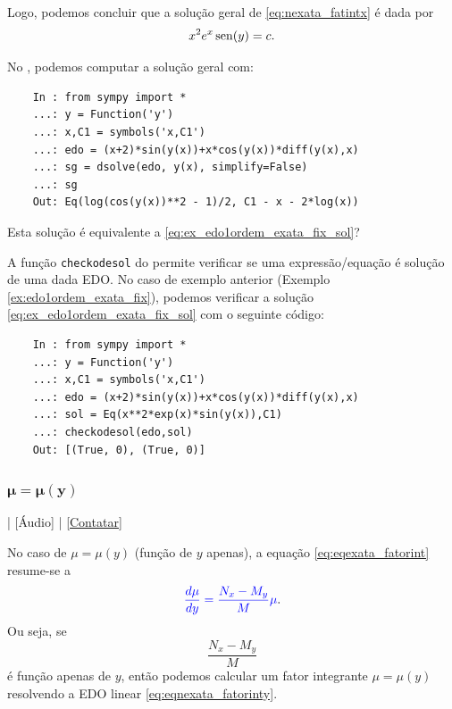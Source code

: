 \begin{ex}
  Logo, podemos concluir que a solução geral de \eqref{eq:nexata_fatintx}  é dada por
  \begin{equation}\label{eq:ex_edo1ordem_exata_fix_sol}
    x^2e^x\operatorname{sen}(y) = c.  
  \end{equation}

  \ifispython
  No \python, podemos computar a solução geral com:
  \begin{lstlisting}
    In : from sympy import *
    ...: y = Function('y')
    ...: x,C1 = symbols('x,C1')
    ...: edo = (x+2)*sin(y(x))+x*cos(y(x))*diff(y(x),x)
    ...: sg = dsolve(edo, y(x), simplify=False)
    ...: sg
    Out: Eq(log(cos(y(x))**2 - 1)/2, C1 - x - 2*log(x))
  \end{lstlisting}
  Esta solução é equivalente a \eqref{eq:ex_edo1ordem_exata_fix_sol}?
  \fi
\end{ex}

\ifispython
\begin{obs}
  A função \verb+checkodesol+ do \sympy permite verificar se uma expressão/equação é solução de uma dada EDO. No caso de exemplo anterior (Exemplo \ref{ex:edo1ordem_exata_fix}), podemos verificar a solução \eqref{eq:ex_edo1ordem_exata_fix_sol} com o seguinte código:
  \begin{lstlisting}
    In : from sympy import *
    ...: y = Function('y')
    ...: x,C1 = symbols('x,C1')
    ...: edo = (x+2)*sin(y(x))+x*cos(y(x))*diff(y(x),x)
    ...: sol = Eq(x**2*exp(x)*sin(y(x)),C1)
    ...: checkodesol(edo,sol)
    Out: [(True, 0), (True, 0)]
  \end{lstlisting}
\end{obs}
\fi

\subsubsection{$\pmb{\mu = \mu(y)}$}

\begin{flushright}
  [Vídeo] | [Áudio] | \href{https://phkonzen.github.io/notas/contato.html}{[Contatar]}
\end{flushright}

No caso de $\mu = \mu(y)$ (função de $y$ apenas), a equação \eqref{eq:eqexata_fatorint} resume-se a
\begin{equation}\label{eq:eqnexata_fatorinty}
  {\color{blue}\frac{d\mu}{dy} = \frac{N_x-M_y}{M}\mu}.
\end{equation}
Ou seja, se
\begin{equation}
  \frac{N_x-M_y}{M}
\end{equation}
é função apenas de $y$, então podemos calcular um fator integrante $\mu = \mu(y)$ resolvendo a EDO linear \eqref{eq:eqnexata_fatorinty}.

